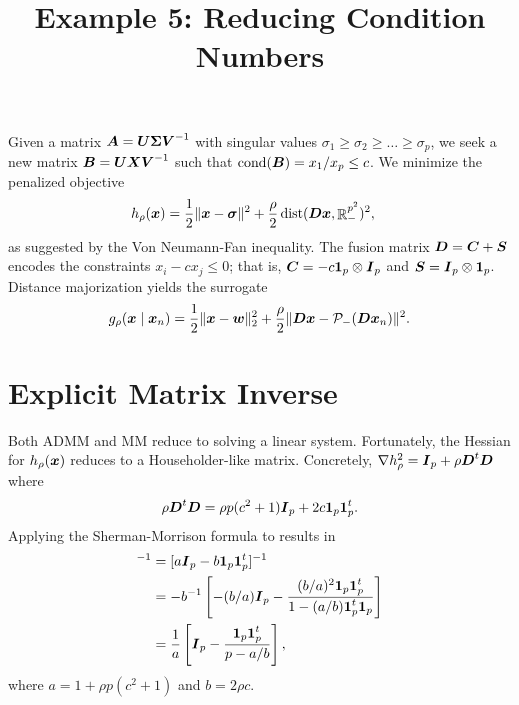 \documentclass[11pt]{article}
\title{Example 5: Reducing Condition Numbers}
\author{}
\date{}
\begin{document}
\maketitle

Given a matrix $\boldsymbol{A} = \boldsymbol{U} \boldsymbol{\Sigma} \boldsymbol{V}^{-1}$ with singular values $\sigma_{1} \ge \sigma_{2} \ge \ldots \ge \sigma_{p}$, we seek a new matrix $\boldsymbol{B} = \boldsymbol{U} \boldsymbol{X} \boldsymbol{V}^{-1}$ such that $\mathrm{cond}(\boldsymbol{B}) = x_{1} / x_{p} \le c$.
We minimize the penalized objective
\begin{align*}
    h_{\rho}(\boldsymbol{x})
    &=
    \frac{1}{2}\|\boldsymbol{x} - \boldsymbol{\sigma}\|^{2}
    +
    \frac{\rho}{2} \mathop{\rm dist}\nolimits(\boldsymbol{D} \boldsymbol{x}, \mathop{\mathbb{R}}\nolimits^{p^{2}}_{-})^{2},
\end{align*}
as suggested by the Von Neumann-Fan inequality.
The fusion matrix $\boldsymbol{D} = \boldsymbol{C} + \boldsymbol{S}$ encodes the constraints $x_{i} - c x_{j} \le 0$; that is, $\boldsymbol{C} = -c \boldsymbol{1}_{p} \otimes \boldsymbol{I}_{p}$ and $\boldsymbol{S} = \boldsymbol{I}_{p} \otimes \boldsymbol{1}_{p}$.
Distance majorization yields the surrogate
\begin{equation*}
    g_{\rho}(\boldsymbol{x} \mid \boldsymbol{x}_{n})
    =
    \frac{1}{2}\|\boldsymbol{x} - \boldsymbol{w}\|_{2}^{2}
    +
    \frac{\rho}{2} \|\boldsymbol{D} \boldsymbol{x} - \mathcal{P}_{-}(\boldsymbol{D} \boldsymbol{x}_{n})\|^{2}.
\end{equation*}

\section*{\center Explicit Matrix Inverse}

Both ADMM and MM reduce to solving a linear system.
Fortunately, the Hessian for $h_{\rho}(\boldsymbol{x})$ reduces to a Householder-like matrix.
Concretely, $\nabla h_{\rho}^{2} = \boldsymbol{I}_{p} + \rho \boldsymbol{D}^{t} \boldsymbol{D}$ where
\begin{equation*}
    \rho \boldsymbol{D}^{t} \boldsymbol{D}
    =
    \rho p (c^{2} + 1) \boldsymbol{I}_{p} + 2 c \boldsymbol{1}_{p} \boldsymbol{1}_{p}^{t}.
\end{equation*}
Applying the Sherman-Morrison formula to results in
\begin{align*}
    [\bI_{p} + \rho \bD^{t} \bD]^{-1}
    &=
    [a \bI_{p} - b \boldsymbol{1}_{p} \boldsymbol{1}_{p}^{t}]^{-1} \\
    &=
    -b^{-1} \left[
        -(b/a) \bI_{p} - \frac{(b/a)^{2} \boldsymbol{1}_{p} \boldsymbol{1}_{p}^{t}}{1 - (a/b) \boldsymbol{1}_{p}^{t} \boldsymbol{1}_{p}}
    \right] \\
    &=
    \frac{1}{a} \left[
        \bI_{p} - \frac{\boldsymbol{1}_{p} \boldsymbol{1}_{p}^{t}}{p - a/b}
    \right],
\end{align*}
where $a = 1+\rho p (c^{2} + 1)$ and $b = 2\rho c$.
\end{document}
